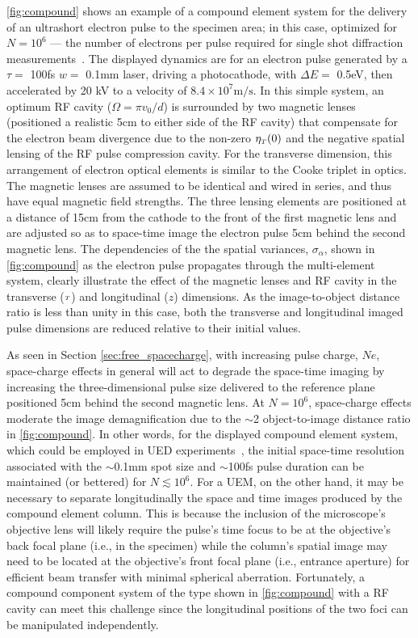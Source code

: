 \ref{fig:compound} shows an example of a compound element system for the delivery of an ultrashort electron pulse to the specimen area; in this case, optimized for $ N = 10^{ 6 } $ --- the number of electrons per pulse required for single shot diffraction measurements~\cite{armstrong_practical_2007}.
The displayed dynamics are for an electron pulse generated by a $\tau = $ 100fs $w = $ 0.1mm laser, driving a photocathode, with $\Delta E = $ 0.5eV, then accelerated by 20 kV to a velocity of $8.4 \times 10^{7} \text{m}/\text{s}$.
In this simple system, an optimum RF cavity ($ \Omega = \pi v_{{ \scriptscriptstyle 0}} / d $) is surrounded by two magnetic lenses (positioned a realistic 5cm to either side of the RF cavity) that compensate for the electron beam divergence due to the non-zero $ \eta_{{\scriptscriptstyle T}} (0) $ and the negative spatial lensing of the RF pulse compression cavity.
For the transverse dimension, this arrangement of electron optical elements is similar to the Cooke triplet in optics.
The magnetic lenses are assumed to be identical and wired in series, and thus have equal magnetic field strengths.
The three lensing elements are positioned at a distance of 15cm from the cathode to the front of the first magnetic lens and are adjusted so as to space-time image the electron pulse 5cm behind the second magnetic lens.
The dependencies of the the spatial variances, $\sigma_{\alpha}$, shown in \ref{fig:compound} as the electron pulse propagates through the multi-element system, clearly illustrate the effect of the magnetic lenses and RF cavity in the transverse (${\scriptscriptstyle T}$) and longitudinal ($z$) dimensions.
As the image-to-object distance ratio is less than unity in this case, both the transverse and longitudinal imaged pulse dimensions are reduced relative to their initial values.

As seen in Section \ref{sec:free_spacecharge}, with increasing pulse charge, $ N e $, space-charge effects in general will act to degrade the space-time imaging by increasing the three-dimensional pulse size delivered to the reference plane positioned 5cm behind the second magnetic lens.
At $ N = 10^{6} $, space-charge effects moderate the image demagnification due to the $\sim$2 object-to-image distance ratio in \ref{fig:compound}. 
In other words, for the displayed compound element system, which could be employed in UED experiments~\cite{oudheusden_electron_2007}, the initial space-time resolution associated with the $\sim$0.1mm spot size and $\sim$100fs pulse duration can be maintained (or bettered) for $N \lesssim 10^{6} $.
For a UEM, on the other hand, it may be necessary to separate longitudinally the space and time images produced by the compound element column.
This is because the inclusion of the microscope's objective lens will likely require the pulse's time focus to be at the objective's back focal plane (i.e., in the specimen) while the column's spatial image may need to be located at the objective's front focal plane (i.e., entrance aperture) for efficient beam transfer with minimal spherical aberration.
Fortunately, a compound component system of the type shown in \ref{fig:compound} with a RF cavity can meet this challenge since the longitudinal positions of the two foci can be manipulated independently.


